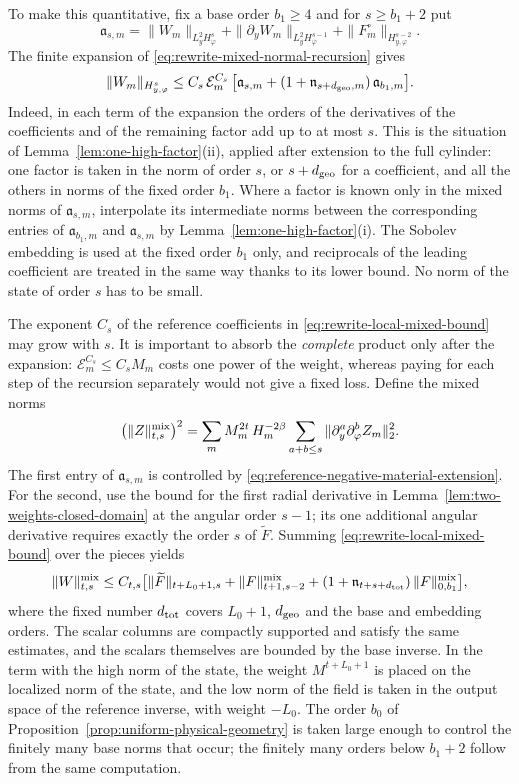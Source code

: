 To make this quantitative, fix a base order $b_1\ge4$ and for
$s\ge b_1+2$ put
\[
 \mathfrak a_{s,m}
 =\|W_m\|_{L_y^2H_\varphi^s}
   +\|\partial_yW_m\|_{L_y^2H_\varphi^{s-1}}
   +\|F_m^\circ\|_{H^{s-2}_{y,\varphi}} .
\]
The finite expansion of
\eqref{eq:rewrite-mixed-normal-recursion} gives
\begin{equation}\label{eq:rewrite-local-mixed-bound}
 \|W_m\|_{H^s_{y,\varphi}}
 \le C_s\,\mathcal E_m^{C_s}\,
       \bigl[\mathfrak a_{s,m}
       +(1+\mathfrak n_{s+d_{\rm geo},m})\,\mathfrak a_{b_1,m}\bigr] .
\end{equation}
Indeed, in each term of the expansion the orders of the derivatives
of the coefficients and of the remaining factor add up to at most
$s$. This is the situation of Lemma~\ref{lem:one-high-factor}(ii),
applied after extension to the full cylinder: one factor is taken in
the norm of order $s$, or $s+d_{\rm geo}$ for a coefficient, and all
the others in norms of the fixed order $b_1$. Where a factor is known
only in the mixed norms of $\mathfrak a_{s,m}$, interpolate its
intermediate norms between the corresponding entries of
$\mathfrak a_{b_1,m}$ and $\mathfrak a_{s,m}$ by
Lemma~\ref{lem:one-high-factor}(i). The Sobolev embedding is used at the fixed order $b_1$
only, and reciprocals of the leading coefficient are treated in the
same way thanks to its lower bound. No norm of the state of order $s$
has to be small.

The exponent $C_s$ of the reference coefficients in
\eqref{eq:rewrite-local-mixed-bound} may grow with $s$. It is
important to absorb the \emph{complete} product only after the
expansion: $\mathcal E_m^{C_s}\le C_sM_m$ costs one power of the
weight, whereas paying for each step of the recursion separately
would not give a fixed loss. Define the mixed norms
\[
 \bigl(\|Z\|_{t,s}^{\rm mix}\bigr)^2
 =\sum_m M_m^{2t}\,H_m^{-2\beta}
       \sum_{a+b\le s}\|\partial_y^a\partial_\varphi^b Z_m\|_2^2 .
\]
The first entry of $\mathfrak a_{s,m}$ is controlled by
\eqref{eq:reference-negative-material-extension}. For the second,
use the bound for the first radial derivative in
Lemma~\ref{lem:two-weights-closed-domain} at the angular order $s-1$;
its one additional angular derivative requires exactly the order $s$
of $\widetilde F$. Summing \eqref{eq:rewrite-local-mixed-bound} over
the pieces yields
\begin{equation}\label{eq:rewrite-global-mixed-bound}
 \|W\|_{t,s}^{\rm mix}
 \le C_{t,s}\bigl[
   \|\widetilde F\|_{t+L_0+1,s}
   +\|F\|_{t+1,s-2}^{\rm mix}
 +(1+\mathfrak n_{t+s+d_{\rm tot}})\,\|F\|_{0,b_1}^{\rm mix}\bigr] ,
\end{equation}
where the fixed number $d_{\rm tot}$ covers $L_0+1$, $d_{\rm geo}$
and the base and embedding orders. The scalar columns are compactly
supported and satisfy the same estimates, and the scalars themselves
are bounded by the base inverse. In the term with the high norm of
the state, the weight $M^{t+L_0+1}$ is placed on the localized norm
of the state, and the low norm of the field is taken in the output
space of the reference inverse, with weight $-L_0$. The order $b_0$
of Proposition~\ref{prop:uniform-physical-geometry} is taken large
enough to control the finitely many base norms that occur; the
finitely many orders below $b_1+2$ follow from the same computation.

